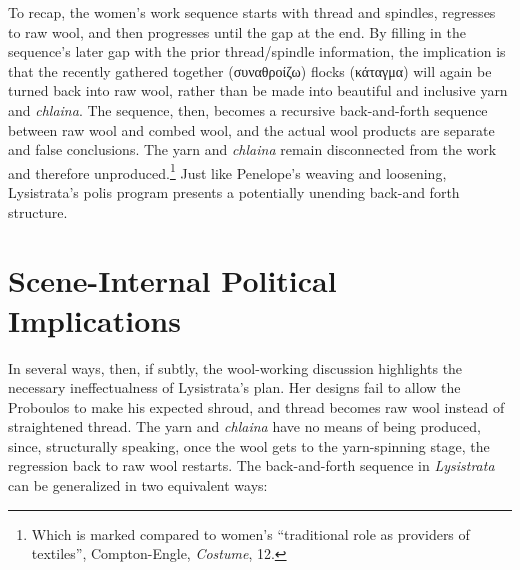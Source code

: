 \documentclass[12pt]{article}
\begin{document}
To recap, the women's work sequence starts with thread and spindles, regresses to raw wool, and then progresses until the gap at the end. By filling in the sequence's later gap with the prior thread/spindle information, the implication is that the recently gathered together (συναθροίζω) flocks (κάταγμα) will again be turned back into raw wool, rather than be made into beautiful and inclusive yarn and \textit{chlaina}. The sequence, then, becomes a recursive back-and-forth sequence between raw wool and combed wool, and the actual wool products are separate and false conclusions. The yarn and \textit{chlaina} remain disconnected from the work and therefore unproduced.\footnote{Which is marked compared to women's ``traditional role as providers of textiles'', Compton-Engle, \textit{Costume}, 12.} Just like Penelope's weaving and loosening, Lysistrata's polis program presents a potentially unending back-and forth structure.

\section{Scene-Internal Political Implications}

In several ways, then, if subtly, the wool-working discussion highlights the necessary ineffectualness of Lysistrata's plan. Her designs fail to allow the Proboulos to make his expected shroud, and thread becomes raw wool instead of straightened thread. The yarn and \textit{chlaina} have no means of being produced, since, structurally speaking, once the wool gets to the yarn-spinning stage, the regression back to raw wool restarts. The back-and-forth sequence in \textit{Lysistrata} can be generalized in two equivalent ways:
\end{document}
